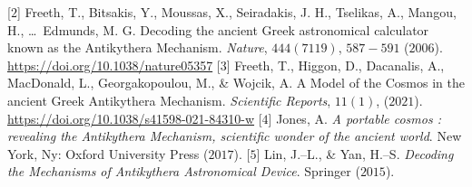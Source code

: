 \begin{multicols}{2}
	\vskip 0.1cm
	[$2$] Freeth, T., Bitsakis, Y., Moussas, X., Seiradakis, J. H., Tselikas, A., Mangou, H., \ldots\, Edmunds, M. G. Decoding the ancient Greek astronomical calculator known as the Antikythera Mechanism. \textit{Nature}, $444(7119)$, $587-591$ ($2006$). \url{https://doi.org/10.1038/nature05357}
	\vskip 0.1cm
	[$3$] Freeth, T., Higgon, D., Dacanalis, A., MacDonald, L., Georgakopoulou, M., \& Wojcik, A. A Model of the Cosmos in the ancient Greek Antikythera Mechanism. \textit{Scientific Reports}, $11(1)$, ($2021$). \url{https://doi.org/10.1038/s41598-021-84310-w}
	\vskip 0.1cm
	[$4$] Jones, A. \textit{A portable cosmos : revealing the Antikythera Mechanism, scientific wonder of the ancient world}. New York, Ny: Oxford University Press  ($2017$).
	\vskip 0.1cm
	[$5$] Lin, J.--L., \& Yan, H.--S. \textit{Decoding the Mechanisms of Antikythera Astronomical Device}. Springer ($2015$).
\end{multicols}